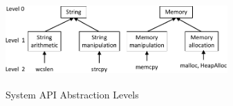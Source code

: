 %
%

\begin{figure}[t]
\begin{center}\vspace{-1mm}
\includegraphics[height=3.5cm, width=8.5cm]{srj-figures/srj-abs-1.pdf} \vspace{-1mm} 
\caption{System API Abstraction Levels}
\label{fig:abs} \vspace{-1mm}
\end{center}
\end{figure}

